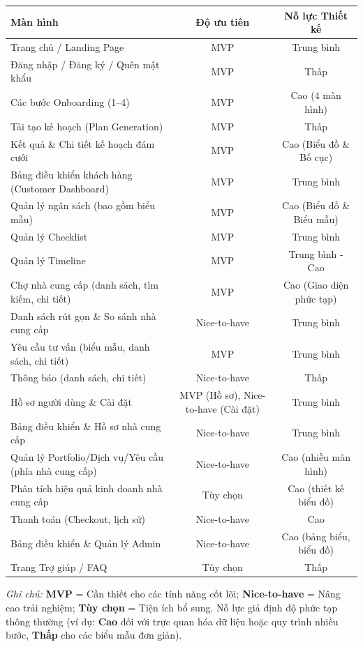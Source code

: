 \documentclass[11pt,a4paper]{article}
\begin{document}
\begin{longtable}{p{7.5cm}cc}
\toprule
\textbf{Màn hình} & \textbf{Độ ưu tiên} & \textbf{Nỗ lực Thiết kế} \\
\midrule
Trang chủ / Landing Page & MVP & Trung bình \\
Đăng nhập / Đăng ký / Quên mật khẩu & MVP & Thấp \\
Các bước Onboarding (1–4) & MVP & Cao (4 màn hình) \\
Tải tạo kế hoạch (Plan Generation) & MVP & Thấp \\
Kết quả \& Chi tiết kế hoạch đám cưới & MVP & Cao (Biểu đồ \& Bố cục) \\
Bảng điều khiển khách hàng (Customer Dashboard) & MVP & Trung bình \\
Quản lý ngân sách (bao gồm biểu mẫu) & MVP & Cao (Biểu đồ \& Biểu mẫu) \\
Quản lý Checklist & MVP & Trung bình \\
Quản lý Timeline & MVP & Trung bình - Cao \\
Chợ nhà cung cấp (danh sách, tìm kiếm, chi tiết) & MVP & Cao (Giao diện phức tạp) \\
Danh sách rút gọn \& So sánh nhà cung cấp & Nice-to-have & Trung bình \\
Yêu cầu tư vấn (biểu mẫu, danh sách, chi tiết) & MVP & Trung bình \\
Thông báo (danh sách, chi tiết) & Nice-to-have & Thấp \\
Hồ sơ người dùng \& Cài đặt & MVP (Hồ sơ), Nice-to-have (Cài đặt) & Trung bình \\
Bảng điều khiển \& Hồ sơ nhà cung cấp & Nice-to-have & Trung bình \\
Quản lý Portfolio/Dịch vụ/Yêu cầu (phía nhà cung cấp) & Nice-to-have & Cao (nhiều màn hình) \\
Phân tích hiệu quả kinh doanh nhà cung cấp & Tùy chọn & Cao (thiết kế biểu đồ) \\
Thanh toán (Checkout, lịch sử) & Nice-to-have & Cao \\
Bảng điều khiển \& Quản lý Admin & Nice-to-have & Cao (bảng biểu, biểu đồ) \\
Trang Trợ giúp / FAQ & Tùy chọn & Thấp \\
\bottomrule
\end{longtable}

\textit{Ghi chú:} \textbf{MVP} = Cần thiết cho các tính năng cốt lõi; \textbf{Nice-to-have} = Nâng cao trải nghiệm; \textbf{Tùy chọn} = Tiện ích bổ sung. Nỗ lực giả định độ phức tạp thông thường (ví dụ: \textbf{Cao} đối với trực quan hóa dữ liệu hoặc quy trình nhiều bước, \textbf{Thấp} cho các biểu mẫu đơn giản).
\end{document}
